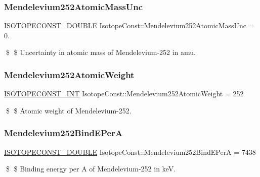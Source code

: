 \subsubsection{\texorpdfstring{Mendelevium252\+Atomic\+Mass\+Unc}{Mendelevium252AtomicMassUnc}}
{\footnotesize\ttfamily \mbox{\hyperlink{group___isotope_const-_macros_ga8f45a7272ce02c0b4c65c44636ed719a}{I\+S\+O\+T\+O\+P\+E\+C\+O\+N\+S\+T\+\_\+\+D\+O\+U\+B\+LE}} Isotope\+Const\+::\+Mendelevium252\+Atomic\+Mass\+Unc = 0.}

\$ \$ Uncertainty in atomic mass of Mendelevium-\/252 in amu. \mbox{\label{group___isotope_const-_mendelevium-_md252_ga0f78845384523c2448f93586f92439c1}} 
\subsubsection{\texorpdfstring{Mendelevium252\+Atomic\+Weight}{Mendelevium252AtomicWeight}}
{\footnotesize\ttfamily \mbox{\hyperlink{group___isotope_const-_macros_ga5f18360b3e99483a35c32d789e62621c}{I\+S\+O\+T\+O\+P\+E\+C\+O\+N\+S\+T\+\_\+\+I\+NT}} Isotope\+Const\+::\+Mendelevium252\+Atomic\+Weight = 252}

\$ \$ Atomic weight of Mendelevium-\/252. \mbox{\label{group___isotope_const-_mendelevium-_md252_ga9f3fcfd62a4610b320c27766f5d75ab3}} 
\subsubsection{\texorpdfstring{Mendelevium252\+Bind\+E\+PerA}{Mendelevium252BindEPerA}}
{\footnotesize\ttfamily \mbox{\hyperlink{group___isotope_const-_macros_ga8f45a7272ce02c0b4c65c44636ed719a}{I\+S\+O\+T\+O\+P\+E\+C\+O\+N\+S\+T\+\_\+\+D\+O\+U\+B\+LE}} Isotope\+Const\+::\+Mendelevium252\+Bind\+E\+PerA = 7438}

\$ \$ Binding energy per A of Mendelevium-\/252 in keV. \mbox{\label{group___isotope_const-_mendelevium-_md252_ga77cd242af0defb1299efc4b8e353366f}} 
